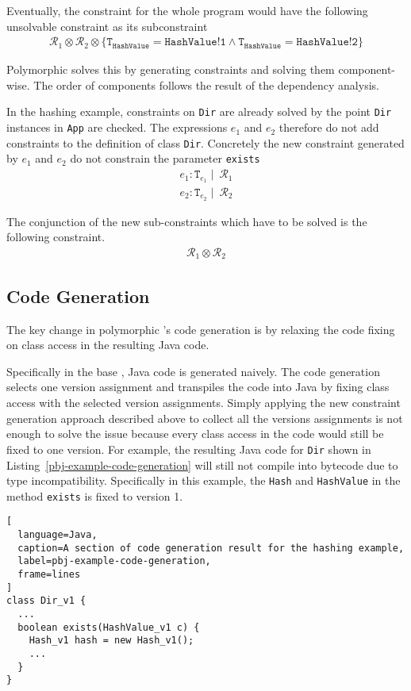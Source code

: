Eventually, the constraint for the whole program would have the following unsolvable constraint as its subconstraint
\begin{align*}
\mathcal{R}_{1} \otimes \mathcal{R}_{2} \otimes \{ \texttt{T}_{\texttt{HashValue}} = \texttt{HashValue!1} 
\wedge \texttt{T}_{\texttt{HashValue}} = \texttt{HashValue!2} \}
\end{align*}

Polymorphic \lang{} solves this by generating constraints and solving them component-wise. 
The order of components follows the result of the dependency analysis.

In the hashing example, constraints on \texttt{Dir} are already solved by the point \texttt{Dir} instances in 
\texttt{App} are checked. The expressions $e_{1}$ and $e_{2}$ therefore do not add constraints to the definition 
of class \texttt{Dir}. 
Concretely the new constraint generated by $e_{1}$ and $e_{2}$ do not constrain the parameter \texttt{exists}
\begin{align*}
e_{1} : \texttt{T}_{e_{1}} \mid \: \mathcal{R}_{1} \\
e_{2} : \texttt{T}_{e_{2}} \mid \: \mathcal{R}_{2}
\end{align*}

The conjunction of the new sub-constraints which have to be solved is the following constraint.
\begin{align*}
\mathcal{R}_{1} \otimes \mathcal{R}_{2}
\end{align*}

\subsection{Code Generation}

The key change in polymorphic \lang{}'s code generation is by relaxing the code fixing on class access in the 
resulting Java code. 

Specifically in the base \lang{}, Java code is generated naively. The code generation selects one version assignment 
and transpiles the code into Java by fixing class access with the selected version assignments. 
Simply applying the new constraint generation approach described above to collect all the versions assignments 
is not enough to solve the issue because every class access in the code would still be fixed to one version.
For example, the resulting Java code for \texttt{Dir} shown in 
Listing~\ref{pbj-example-code-generation} will still not compile into bytecode due to type incompatibility. 
Specifically in this example, the \texttt{Hash} and \texttt{HashValue} in the method \texttt{exists} is fixed to version 1.
\begin{lstlisting}[
  language=Java,
  caption=A section of code generation result for the hashing example,
  label=pbj-example-code-generation,
  frame=lines
]
class Dir_v1 {
  ...
  boolean exists(HashValue_v1 c) {
    Hash_v1 hash = new Hash_v1();
    ...
  }
}
\end{lstlisting}


